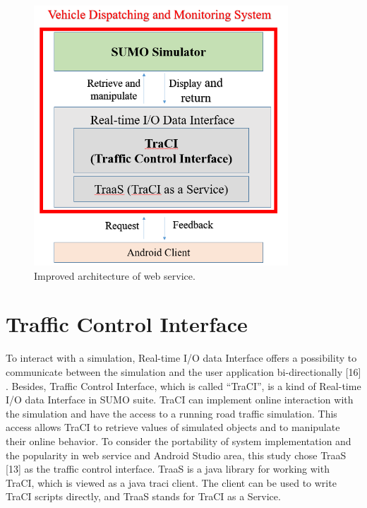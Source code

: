 \documentclass[12pt]{ksthesis}
\begin{document}
\begin{thesis}
{\begin{figure}[t!]
\centering
\includegraphics[width=0.85\textwidth]{./Thesis_figures/F4-1_webService_arcitecture.PNG}
\caption{\large Improved architecture of web service.}
\vspace{0.5cm}
\label{Fig:Improved_architecture_of_web_service}
\end{figure}



\section{Traffic Control Interface}
To interact with a simulation, Real-time I/O data Interface offers a possibility to communicate between the simulation and the user application bi-directionally [16] \cite{Fischer}. Besides, Traffic Control Interface, which is called “TraCI”, is a kind of Real-time I/O data Interface in SUMO suite.
TraCI can implement online interaction with the simulation and have the access to a running road traffic simulation. This access allows TraCI to retrieve values of simulated objects and to manipulate their online behavior.
To consider the portability of system implementation and the popularity in web service and Android Studio area, this study chose TraaS [13] as the traffic control interface. TraaS is a java library for working with TraCI, which is viewed as a java traci client. The client can be used to write TraCI scripts directly, and TraaS stands for TraCI as a Service.

}
\end{thesis}
\end{document}
